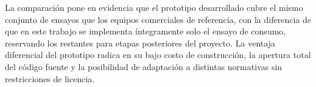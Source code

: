 La comparación pone en evidencia que el prototipo desarrollado cubre
el mismo conjunto de ensayos que los equipos comerciales de referencia,
con la diferencia de que en este trabajo se implementa íntegramente
solo el ensayo de consumo, reservando los restantes para etapas
posteriores del proyecto.
La ventaja diferencial del prototipo radica en su bajo costo de
construcción, la apertura total del código fuente y la posibilidad
de adaptación a distintas normativas sin restricciones de licencia.
